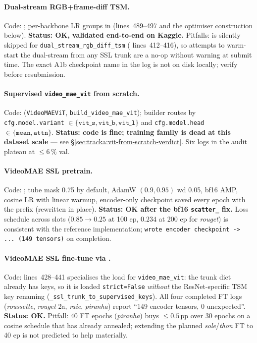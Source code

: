 \paragraph{Dual-stream RGB+frame-diff TSM.}  Code:
;
per-backbone LR groups in
 (lines~489--497 and the optimiser
construction below).  \textbf{Status: OK, validated end-to-end on
Kaggle.}  Pitfalls:  is silently skipped for
\texttt{dual\_stream\_rgb\_diff\_tsm} ( lines~412--416), so
attempts to warm-start the dual-stream from any SSL trunk are a no-op
without warning at submit time.  The exact A1b checkpoint name in the
log is not on disk locally; verify
 before resubmission.

\paragraph{Supervised \texttt{video\_mae\_vit} from scratch.}  Code:
 (\texttt{VideoMAEViT},
\texttt{build\_video\_mae\_vit}); builder routes by
\texttt{cfg.model.variant} \(\in\{\texttt{vit\_s}, \texttt{vit\_b},
\texttt{vit\_l}\}\) and \texttt{cfg.model.head}
\(\in\{\texttt{mean}, \texttt{attn}\}\).  \textbf{Status: code is fine;
training family is dead at this dataset scale} --- see
\S\ref{sec:tracka:vit-from-scratch-verdict}.  Six logs in the audit
plateau at \(\le 6\,\%\) val.

\paragraph{VideoMAE SSL pretrain.}  Code:
; tube mask 0.75 by
default, AdamW \((0.9, 0.95)\) wd 0.05, bf16 AMP, cosine LR with linear
warmup, encoder-only checkpoint saved every epoch with the
 prefix (rewritten in place).  \textbf{Status: OK after
the bf16 \texttt{scatter\_} fix.}  Loss schedule across slots
(\(0.85 \to 0.25\) at 100 ep, \(0.234\) at 200 ep for \emph{rouget}) is
consistent with the reference implementation; \texttt{wrote encoder
checkpoint -> ... (149 tensors)} on completion.

\paragraph{VideoMAE SSL fine-tune via .}  Code:
 lines~428--441 specialises the
load for \texttt{video\_mae\_vit}: the trunk dict already has
 keys, so it is loaded \texttt{strict=False} \emph{without}
the ResNet-specific TSM key renaming
(\texttt{\_ssl\_trunk\_to\_supervised\_keys}).  All four completed FT
logs (\emph{roussette}, \emph{rouget} 2a, \emph{raie}, \emph{piranha})
report ``149 encoder tensors, 0 unexpected''.  \textbf{Status: OK.}
Pitfall: 40 FT epochs (\emph{piranha}) buys
\(\le 0.5\,\)pp over 30 epochs on a cosine schedule that has already
annealed; extending the planned \emph{sole}/\emph{thon} FT to 40 ep is
not predicted to help materially.


